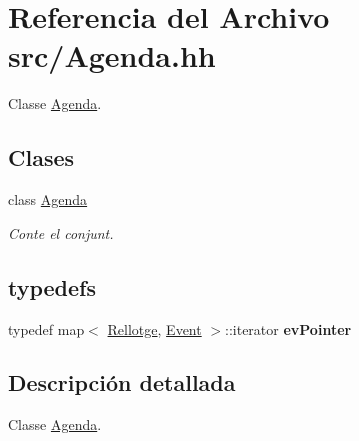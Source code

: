 \hypertarget{_agenda_8hh}{}\section{Referencia del Archivo src/\+Agenda.hh}
\label{_agenda_8hh}


Classe \hyperlink{class_agenda}{Agenda}.  


\subsection*{Clases}
\begin{DoxyCompactItemize}
\item 
class \hyperlink{class_agenda}{Agenda}
\begin{DoxyCompactList}\small\item\em Conte el conjunt. \end{DoxyCompactList}\end{DoxyCompactItemize}
\subsection*{\textquotesingle{}typedefs\textquotesingle{}}
\begin{DoxyCompactItemize}
\item 
\hypertarget{_agenda_8hh_af9d866fd0998c8004f720d0af3bc6276}{}typedef map$<$ \hyperlink{class_rellotge}{Rellotge}, \hyperlink{class_event}{Event} $>$\+::iterator {\bfseries ev\+Pointer}\label{_agenda_8hh_af9d866fd0998c8004f720d0af3bc6276}

\end{DoxyCompactItemize}


\subsection{Descripción detallada}
Classe \hyperlink{class_agenda}{Agenda}. 

